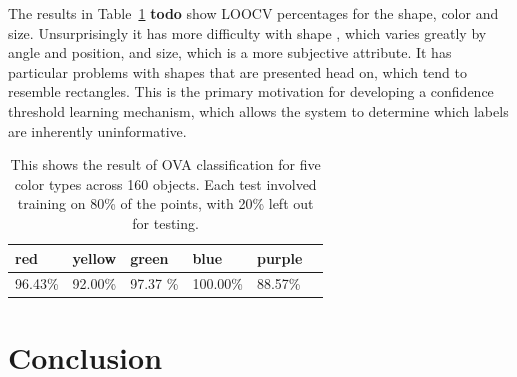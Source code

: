 \documentclass[11pt]{article}
\newcommand{\xxx}[1]{{\bf \color{red} #1}}
\newcommand\T{\rule{0pt}{3ex}}
\newcommand\B{\rule[-1.2ex]{0pt}{0pt}}
\begin{document}
The results in Table~\ref{tbl:testresults} \xxx{todo} show LOOCV percentages
for the shape, color and size.  Unsurprisingly it has more difficulty with shape
, which varies greatly by angle and position, and size, which is a more
subjective attribute. It has particular problems with shapes that are presented
head on, which tend to resemble rectangles.  This is the primary motivation for
developing a confidence threshold learning mechanism, which allows the system
to determine which labels are inherently uninformative.


\begin{table}
\centering
\begin{tabular}{ | l | l | l | l | l | l |}
    \hline
    red &  yellow & green & blue & purple \T \B \\ \hline
    96.43\%  & 92.00\% & 97.37 \% & 100.00\% & 88.57\% \B \T \\ \hline
\end{tabular}
\caption{This shows the result of OVA classification for five color types
    across 160 objects. Each test involved training on 80\% of the points,
           with 20\% left out for testing.}
\label{tbl:testresults}
\end{table}



\section{Conclusion}




\end{document}
